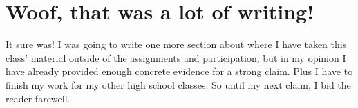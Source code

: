 \documentclass[11pt]{article}
\begin{document}
\section{Woof, that was a lot of writing!}
\label{sec:org0ff5f8b}

It sure was! I was going to write one more section about where I have taken this class'
material outside of the assignments and participation, but in my opinion I have already
provided enough concrete evidence for a strong claim. Plus I have to finish my work for
my other high school classes. So until my next claim, I bid the reader farewell. 
\end{document}
